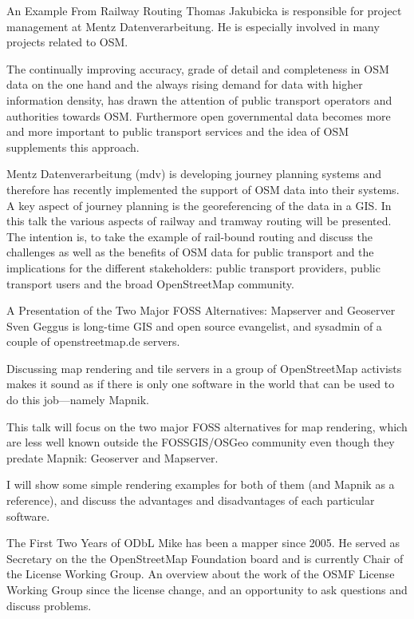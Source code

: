 %
{An Example From Railway Routing}%
{Thomas Jakubicka is responsible for project management at Mentz Datenverarbeitung. He is especially involved in many projects related to OSM.}%
{The continually improving accuracy, grade of detail and completeness in OSM data on the one hand and the always rising demand for data with higher information density, has drawn the attention of public transport operators and authorities towards OSM. Furthermore open governmental data becomes more and more important to public transport services and the idea of OSM supplements this approach.

Mentz Datenverarbeitung (mdv) is developing journey planning systems and therefore has recently implemented the support of OSM data into their systems. A key aspect of journey planning is the georeferencing of the data in a GIS. In this talk the various aspects of railway and tramway routing will be presented. The intention is, to take the example of rail-bound routing and discuss the challenges as well as the benefits of OSM data for public transport and the implications for the different stakeholders: public transport providers, public transport users and the broad OpenStreetMap community.}



%
{A Presentation of the Two Major FOSS Alternatives: Mapserver and Geoserver}%
{Sven Geggus is long-time GIS and open source evangelist, and sysadmin of a couple of openstreetmap.de servers.}%
{Discussing map rendering and tile servers in a group of OpenStreetMap activists makes it sound as if there is only one software in the world that can be used to do this job---namely Mapnik.

This talk will focus on the two major FOSS alternatives for map rendering, which are less well
known outside the FOSSGIS/OSGeo community even though they predate Mapnik: Geoserver and Mapserver.

I will show some simple rendering examples for both of them (and Mapnik as a reference), and discuss the advantages and disadvantages of each particular software.}

%
{The First Two Years of ODbL}%
{Mike has been a mapper since 2005. He served as Secretary on the the OpenStreetMap Foundation board and is currently Chair of the License Working Group. }%
{An overview about the work of the OSMF License Working Group since the license change, and an opportunity to ask questions and discuss problems. }

